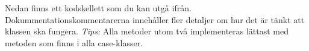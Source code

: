 \noindent Nedan finns ett kodskellett som du kan utgå ifrån. Dokummentationskommentarerna innehåller fler detaljer om hur det är tänkt att klassen ska fungera. %
 \emph{Tips:} Alla metoder utom två implementeras lättast med metoden  som finns i alla case-klasser.

\begin{figure}[H]
\label{code:classes:graphics:rectanglesequence}
\end{figure}


